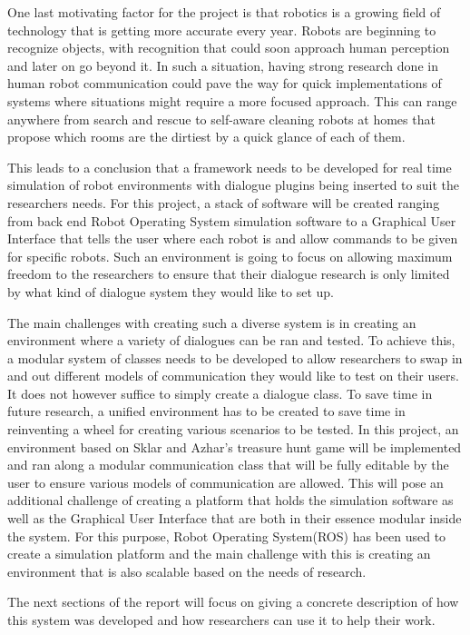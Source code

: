 \documentclass{report}
\begin{document}
    One last motivating factor for the project is that robotics is a growing field of technology that is getting more accurate every year. Robots are beginning to recognize objects, with recognition that could soon approach human perception and later on go beyond it. In such a situation, having strong research done in human robot communication could pave the way for quick implementations of systems where situations might require a more focused approach. This can range anywhere from search and rescue to self-aware cleaning robots at homes that propose which rooms are the dirtiest by a quick glance of each of them.

    This leads to a conclusion that a framework needs to be developed for real time simulation of robot environments with dialogue plugins being inserted to suit the researchers needs. For this project, a stack of software will be created ranging from back end Robot Operating System simulation software to a Graphical User Interface that tells the user where each robot is and allow commands to be given for specific robots. Such an environment is going to focus on allowing maximum freedom to the researchers to ensure that their dialogue research is only limited by what kind of dialogue system they would like to set up.

    The main challenges with creating such a diverse system is in creating an environment where a variety of dialogues can be ran and tested. To achieve this, a modular system of classes needs to be developed to allow researchers to swap in and out different models of communication they would like to test on their users. It does not however suffice to simply create a dialogue class. To save time in future research, a unified environment has to be created to save time in reinventing a wheel for creating various scenarios to be tested. In this project, an environment based on Sklar and Azhar’s treasure hunt game will be implemented and ran along a modular communication class that will be fully editable by the user to ensure various models of communication are allowed. This will pose an additional challenge of creating a platform that holds the simulation software as well as the Graphical User Interface that are both in their essence modular inside the system. For this purpose, Robot Operating System(ROS) has been used to create a simulation platform and the main challenge with this is creating an environment that is also scalable based on the needs of research.

    The next sections of the report will focus on giving a concrete description of how this system was developed and how researchers can use it to help their work.
\end{document}
